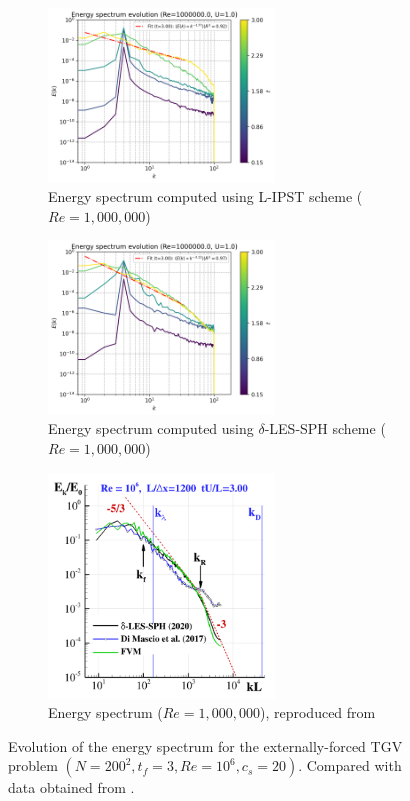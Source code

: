 \begin{figure}[htbp!]
  \begin{subfigure}{7cm}
  \centering\includegraphics[width=6cm]{Code-Figures/ext-force-tgv/c0_20_tait_hdx_2_pec_dtmul_1_sd_n_o_files_80_nx_200_pst_10_re_1000000_tsph_wcsph_tf_3/energy_spectrum_evolution_all.png}
  \caption{Energy spectrum computed using L-IPST scheme ($Re = 1,000,000$)}
  \end{subfigure}
  \begin{subfigure}{7cm}
  \centering\includegraphics[width=6cm]{Code-Figures/ext-force-tgv/c0_20_tait_hdx_2_rk2_dtmul_1.5_n_o_files_80_nx_200_pst_10_re_1000000_deltales_tf_3/energy_spectrum_evolution_all.png}
  \caption{Energy spectrum computed using $\delta$-LES-SPH scheme ($Re = 1,000,000$)}
  \end{subfigure}
  \begin{subfigure}{7cm}
  \centering\includegraphics[width=6cm]{Code-Figures/ext-force-tgv/colag_ek_t_3.png}
  \caption{Energy spectrum ($Re = 1,000,000$), reproduced from \cite{Antuono_Marrone_Di_Mascio_Colagrossi_2021}}
  \end{subfigure}
  \caption{Evolution of the energy spectrum for the externally-forced TGV problem $(N=200^2, t_f=3, Re=10^6, c_s=20)$. Compared with data obtained from \cite{Antuono_Marrone_Di_Mascio_Colagrossi_2021}.}
  \label{fig:tgv-forced-espec}
\end{figure}

